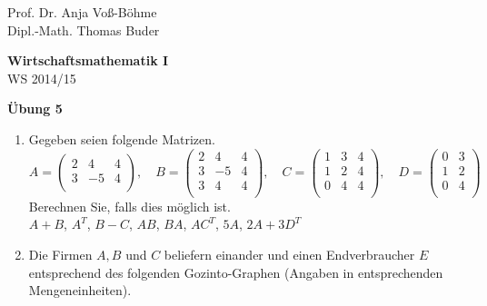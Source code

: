 \documentclass[12pt,a4paper]{scrreprt}
\begin{document}
 
\begin{flushleft}
Prof. Dr. Anja Voß-Böhme \\
Dipl.-Math. Thomas Buder
\end{flushleft}

\begin{center}
\large{\textbf{ Wirtschaftsmathematik I}} \\
WS 2014/15 \end{center}

\begin{center}\large{\textbf{ Übung 5 }} \end{center}

\bigskip
\begin{enumerate}
\item Gegeben seien folgende Matrizen. 
\[A=\begin{pmatrix}
2 & 4 & 4\\
3 & -5 & 4\\

\end{pmatrix}, \quad B=\begin{pmatrix}
2 & 4 & 4\\
3 & -5 & 4\\
3 & 4 & 4\\
\end{pmatrix}, \quad C=\begin{pmatrix}
1 & 3 & 4\\
1 & 2 & 4\\
0 & 4 & 4\\
\end{pmatrix},\quad D=\begin{pmatrix}
0 & 3 \\
1 & 2 \\
0 & 4 \\
\end{pmatrix}\]
Berechnen Sie, falls dies möglich ist. \\

 $A + B$, \quad $A^T$, \quad $B - C$, \quad $AB$, \quad $BA$, \quad $AC^T$, \quad $5A$, \quad $2A+3D^T$



\item Die Firmen $A,B$ und $C$ beliefern einander und einen Endverbraucher $E$ entsprechend des folgenden
Gozinto-Graphen (Angaben in entsprechenden Mengeneinheiten). 


\end{enumerate}
\end{document}
